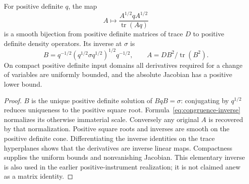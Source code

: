 \begin{lemma}\label{lem:congruence}
For positive definite $q$, the map
\[
 A\longmapsto \frac{A^{1/2}qA^{1/2}}{\operatorname{tr}(Aq)}
\]
is a smooth bijection from positive definite matrices of trace $D$ to positive definite density operators. Its inverse at $\sigma$ is
\begin{equation}\label{eq:congruence-inverse}
 B=q^{-1/2}(q^{1/2}\sigma q^{1/2})^{1/2}q^{-1/2},
 \qquad A=DB^2/\operatorname{tr}(B^2).
\end{equation}
On compact positive definite input domains all derivatives required for a change of variables are uniformly bounded, and the absolute Jacobian has a positive lower bound.
\end{lemma}
\begin{proof}
$B$ is the unique positive definite solution of $BqB=\sigma$: conjugating by $q^{1/2}$ reduces uniqueness to the positive square root. Formula~\eqref{eq:congruence-inverse} normalizes its otherwise immaterial scale. Conversely any original $A$ is recovered by that normalization. Positive square roots and inverses are smooth on the positive definite cone. Differentiating the inverse identities on the trace hyperplanes shows that the derivatives are inverse linear maps. Compactness supplies the uniform bounds and nonvanishing Jacobian. This elementary inverse is also used in the earlier positive-instrument realization; it is not claimed anew as a matrix identity.
\end{proof}


